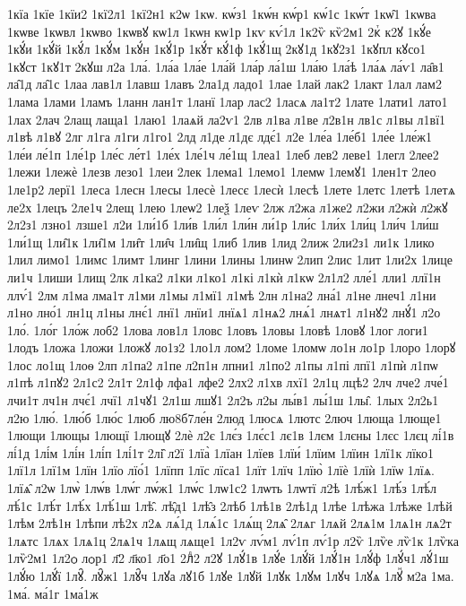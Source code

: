 {1кїа
1кїе
1кїи2
1кї2л1
1кї2н1
к2ѡ
1кѡ.
кѡ́з1
1кѡ́н
кѡ́р1
кѡ́1с
1кѡ́т
1кѡ̑1
1кѡва
1кѡве
1кѡвл
1кѡво
1кѡвꙋ
кѡ1л
1кѡн
кѡ1р
1кѵ
кѵ́1л
1к2ѷ
кѷ2м1
2кⷮ
к2ꙋ
1кꙋ́е
1кꙋ́и
1кꙋ́й
1кꙋ́л
1кꙋ́м
1кꙋ́н
1кꙋ́1р
1кꙋ́т
кꙋ́1ф
1кꙋ́1щ
2кꙋ1д
1кꙋ2з1
1кꙋпл
кꙋсо1
1кꙋст
1кꙋ1т
2кꙋш
л2а
1ла́.
1ла́а
1ла́е
1ла́й
1ла́р
ла́1ш
1ла́ю
1ла́ѣ
1ла́ѧ
ла́ѵ1
ла̑в1
ла̑1д
ла̑1с
1лаа
лав1л
1лавш
1лавъ
2ла1д
ладо1
1лае
1лай
лак2
1лакт
1лал
лам2
1лама
1лами
1ламъ
1ланн
лан1т
1ланї
1лар
лас2
1ласѧ
ла1т2
1лате
1лати1
лато1
1лах
2лач
2лащ
лаща1
1лаю1
1лаѧй
ла2ѵ1
2лв
л1ва
л1ве
л2в1н
лв1с
л1вы
л1вї1
л1вѣ
л1вꙋ
2лг
л1га
л1ги
л1го1
2лд
л1де
л1дє
лдє́1
л2е
1ле́а
1ле́б1
1ле́е
1ле́ж1
1ле́и
ле́1п
1ле́1р
1ле́с
ле́т1
1ле́х
1ле́1ч
ле́1щ
1леа1
1леб
лев2
леве1
1легл
2лее2
1лежи
1лежѐ
1лезв
лезо1
1леи
2лек
1лема1
1лемо1
1лемѡ
1лемꙋ1
1лен1т
2лео
1ле1р2
лерї1
1леса
1лесн
1лесы
1лесѐ
1лесє
1лесѝ
1лесѣ
1лете
1летс
1летѣ
1летѧ
ле2х
1лецъ
2ле1ч
2лещ
1лею
1леѡ2
1леѯ
1леѵ
2лж
л2жа
л1же2
л2жи
л2жѝ
л2жꙋ
2л2з1
лзно1
лзше1
л2и
1ли́1б
1ли́в
1ли́л
1ли́н
ли́1р
1ли́с
1ли́х
1ли́ц
1ли́ч
1ли́ш
1ли́1щ
1ли̑1к
1ли̑1м
1ли̑т
1ли̑ч
1ли̑щ
1либ
1лив
1лид
2лиж
2ли2з1
ли1к
1лико
1лил
лимо1
1лимс
1лимт
1линг
1лини
1лины
1линѡ
2лип
2лис
1лит
1ли2х
1лице
ли1ч
1лиши
1лищ
2лк
л1ка2
л1ки
л1ко1
л1кі
л1кѝ
л1кѡ
2л1л2
лле́1
лли1
ллї1н
ллѵ́1
2лм
л1ма
лма1т
л1ми
л1мы
л1мї1
л1мѣ
2лн
л1на2
лна́1
л1не
лнеч1
л1ни
л1но
лно́1
лн1ц
л1ны
лнє́1
лнї1
лнїи1
лнїѧ1
л1нѧ2
лнѧ́1
лнѧт1
л1нꙋ2
лнꙋ́1
л2о
1ло́.
1ло́г
1ло́ж
лоб2
1лова
лов1л
1ловс
1ловъ
1ловы
1ловѣ
1ловꙋ
1лог
логи1
1лодъ
1ложа
1ложи
1ложꙋ
ло1з2
1ло1л
лом2
1ломе
1ломѡ
ло1н
ло1р
1лоро
1лорꙋ
1лос
ло1щ
1лоѳ
2лп
л1па2
л1пе
л2п1н
лпни1
л1по2
л1пы
л1пі
лпї1
л1пѝ
л1пѡ
л1пѣ
л1пꙋ2
2л1с2
2л1т
2л1ф
лфа1
лфе2
2лх2
л1хв
лхї1
2л1ц
лцѣ2
2лч
лче2
лче́1
лчи1т
лч1н
лчє́1
лчї1
л1чꙋ1
2л1ш
лшꙋ1
2л2ъ
л2ы
лы́в1
лы́1ш
1лы̑.
1лых
2л2ь1
л2ю
1лю́.
1лю́б
1лю́с
1люб
лю8б7ле́н
2люд
1люсѧ
1лютс
2люч
1люща
1люще1
1лющи
1лющы
1лющї
1лющꙋ
2лѐ
л2є
1лє́з
1лє́с1
лє1в
1лєм
1лєны
1лєс
1лєц
лі́1в
лі́1д
1лі́м
1лі́н
1лі́п
1лі́1т
2лі̑
л2ї
1лїа̀
1лїан
1лїев
1лїи́
1лїим
1лїин
1лї1к
лїко1
1лї1л
1лї1м
1лїн
1лїо
лїо́1
1лїпп
1лїс
лїса1
1лїт
1лїч
1лїю̀
1лїѐ
1лїѝ
1лїѡ
1лїѧ.
1лїѧ̑
л2ѡ
1лѡ̀
1лѡ́в
1лѡ́г
лѡ́ж1
1лѡ́с
1лѡ1с2
1лѡть
1лѡтї
л2ѣ
1лѣ́ж1
1лѣ́з
1лѣ́л
лѣ́1с
1лѣ́т
1лѣ́х
1лѣ́1ш
1лѣ̑.
лѣ̑д1
1лѣ̑з
2лѣб
1лѣ1в
2лѣ1д
1лѣе
1лѣжа
1лѣже
1лѣй
1лѣм
2лѣ1н
1лѣпи
лѣ2х
л2ѧ
лѧ́1д
1лѧ́1с
1лѧ́щ
2лѧ̑
2лѧг
1лѧй
2лѧ1м
1лѧ1н
лѧ2т
1лѧтс
1лѧх
1лѧ1ц
2лѧ1ч
1лѧщ
лѧще1
1л2ѵ
лѵ́м1
лѵ́1п
лѵ́1р
л2ѷ
1лѷе
лѷ1к
1лѷка
1лѷ2м1
1л2ѻ
лѻр1
л҃2
л҃ко1
л҃о1
2лⷣ2
л2ꙋ
1лꙋ́1в
1лꙋ́е
1лꙋ́й
1лꙋ́1н
1лꙋ́ф
1лꙋ́ч1
лꙋ́1ш
1лꙋ́ю
1лꙋ́ї
1лꙋ̑.
лꙋ̑ж1
1лꙋ̑ч
1лꙋа
лꙋ1б
1лꙋе
1лꙋй
1лꙋк
1лꙋм
1лꙋч
1лꙋѧ
1лꙋⷩ
м2а
1ма.
1ма́.
ма́1г
1ма́1ж
}

